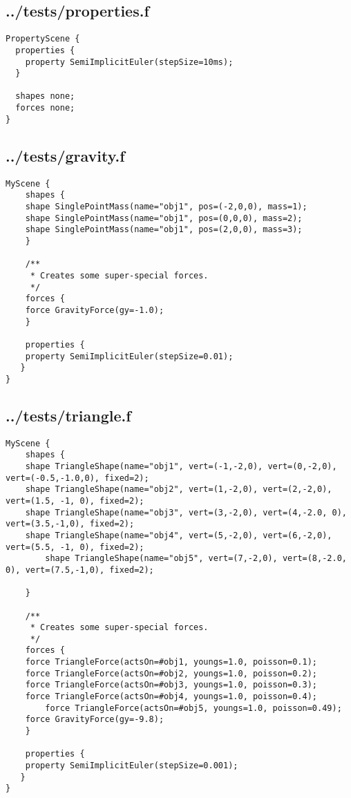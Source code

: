\subsection*{../tests/properties.f}
\begin{lstlisting}
PropertyScene {
  properties {
    property SemiImplicitEuler(stepSize=10ms);
  }

  shapes none;
  forces none;
}
\end{lstlisting}

\subsection*{../tests/gravity.f}
\begin{lstlisting}
MyScene {
    shapes {
	shape SinglePointMass(name="obj1", pos=(-2,0,0), mass=1);
	shape SinglePointMass(name="obj1", pos=(0,0,0), mass=2);
	shape SinglePointMass(name="obj1", pos=(2,0,0), mass=3);
    }

    /**
     * Creates some super-special forces.
     */
    forces {
	force GravityForce(gy=-1.0);
    }

    properties { 
	property SemiImplicitEuler(stepSize=0.01);
   }
}
\end{lstlisting}

\subsection*{../tests/triangle.f}
\begin{lstlisting}
MyScene {
    shapes {
	shape TriangleShape(name="obj1", vert=(-1,-2,0), vert=(0,-2,0), vert=(-0.5,-1.0,0), fixed=2);
	shape TriangleShape(name="obj2", vert=(1,-2,0), vert=(2,-2,0), vert=(1.5, -1, 0), fixed=2);
	shape TriangleShape(name="obj3", vert=(3,-2,0), vert=(4,-2.0, 0), vert=(3.5,-1,0), fixed=2);
	shape TriangleShape(name="obj4", vert=(5,-2,0), vert=(6,-2,0), vert=(5.5, -1, 0), fixed=2);
        shape TriangleShape(name="obj5", vert=(7,-2,0), vert=(8,-2.0, 0), vert=(7.5,-1,0), fixed=2);

	}

    /**
     * Creates some super-special forces.
     */
    forces {
	force TriangleForce(actsOn=#obj1, youngs=1.0, poisson=0.1);
	force TriangleForce(actsOn=#obj2, youngs=1.0, poisson=0.2);
	force TriangleForce(actsOn=#obj3, youngs=1.0, poisson=0.3);
	force TriangleForce(actsOn=#obj4, youngs=1.0, poisson=0.4);
        force TriangleForce(actsOn=#obj5, youngs=1.0, poisson=0.49);
	force GravityForce(gy=-9.8);
    }

    properties { 
	property SemiImplicitEuler(stepSize=0.001);
   }
}
\end{lstlisting}

